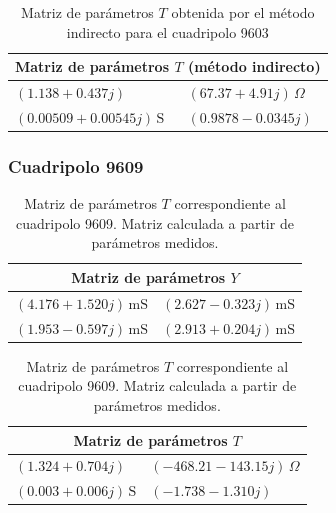 \begin{table}[H]
\centering
\begin{tabular}{|l|l|}
\hline
\multicolumn{2}{|c|}{\textbf{Matriz de parámetros $T$ (método indirecto)}} \\ \hline
$(1.138 + 0.437j)$ & $(67.37 + 4.91j)\,\Omega$ \\ \hline
$(0.00509 + 0.00545j)\,\mathrm{S}$ & $(0.9878 - 0.0345j)$ \\ \hline
\end{tabular}
\caption{Matriz de parámetros $T$ obtenida por el método indirecto para el cuadripolo 9603}
\label{tab:matriz_T9603_indirecta}
\end{table}
	
	\subsubsection*{Cuadripolo 9609}
	

\begin{table}[H]
\centering
\begin{minipage}{0.48\textwidth}
\centering
\begin{tabular}{|l|l|}
\hline
\multicolumn{2}{|c|}{\textbf{Matriz de parámetros $Y$}} \\ \hline
$(4.176 + 1.520j)\,\mathrm{mS}$ & $(2.627 - 0.323j)\,\mathrm{mS}$ \\ \hline
$(1.953 - 0.597j)\,\mathrm{mS}$ & $(2.913 + 0.204j)\,\mathrm{mS}$ \\ \hline
\end{tabular}
\caption{Matriz de parámetros $Y$ correspondiente al cuadripolo 9609. Matriz calculada a partir de parámetros medidos.}
\label{tab:matriz_Y_9609}
\end{minipage}
\hfill
\begin{minipage}{0.48\textwidth}
\centering
\begin{tabular}{|l|l|}
\hline
\multicolumn{2}{|c|}{\textbf{Matriz de parámetros $T$}} \\ \hline
$(1.324 + 0.704j)$ & $(-468.21 - 143.15j)\,\Omega$ \\ \hline
$(0.003 + 0.006j)\,\mathrm{S}$ & $(-1.738 - 1.310j)$ \\ \hline
\end{tabular}
\caption{Matriz de parámetros $T$ correspondiente al cuadripolo 9609. Matriz calculada a partir de parámetros medidos.}
\label{tab:matriz_T_9609}
\end{minipage}
\end{table}


